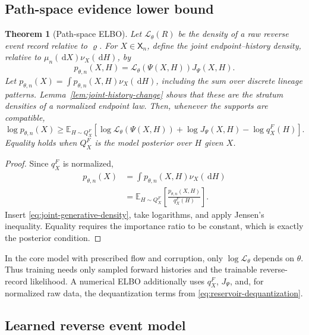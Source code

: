 \documentclass[10pt]{article}
\newtheorem{theorem}{Theorem}[section]
\theoremstyle{definition}
\theoremstyle{remark}
\newcommand{\E}{\mathbb{E}}
\newcommand{\dd}{\,\mathrm{d}}
\newcommand{\state}{\mathsf{X}}
\begin{document}
\subsection{Path-space evidence lower bound}

\begin{theorem}[Path-space ELBO]
\label{thm:path-elbo}
Let $\mathcal L_\theta(R)$ be the density of a raw reverse event record
relative to $\varrho$.  For $X\in\state_n$, define the joint
endpoint--history density, relative to
$\mu_n(\dd X)\nu_X(\dd H)$, by
\begin{equation}
  p_{\theta,n}(X,H)
  =\mathcal L_\theta(\Psi(X,H))J_\Psi(X,H).
  \label{eq:joint-generative-density}
\end{equation}
Let
$p_{\theta,n}(X)=\int p_{\theta,n}(X,H)\nu_X(\dd H)$, including the sum
over discrete lineage patterns.  Lemma~\ref{lem:joint-history-change} shows
that these are the stratum densities of a normalized endpoint law.  Then,
whenever the supports are compatible,
\begin{equation}
  \log p_{\theta,n}(X)
  \geq
  \E_{H\sim Q_X^F}
  \left[
    \log\mathcal L_\theta(\Psi(X,H))
    +\log J_\Psi(X,H)
    -\log q_X^F(H)
  \right].
  \label{eq:path-elbo}
\end{equation}
Equality holds when $Q_X^F$ is the model posterior over $H$ given $X$.
\end{theorem}

\begin{proof}
Since $q_X^F$ is normalized,
\begin{align*}
  p_{\theta,n}(X)
  &=\int p_{\theta,n}(X,H)\nu_X(\dd H)\\
  &=\E_{H\sim Q_X^F}
  \left[\frac{p_{\theta,n}(X,H)}{q_X^F(H)}\right].
\end{align*}
Insert \eqref{eq:joint-generative-density}, take logarithms, and apply
Jensen's inequality.  Equality requires the importance ratio to be constant,
which is exactly the posterior condition.
\end{proof}

In the core model with prescribed flow and corruption,
only $\log\mathcal L_\theta$ depends on $\theta$.  Thus training needs only
sampled forward histories and the trainable reverse-record likelihood.  A
numerical ELBO additionally uses $q_X^F$, $J_\Psi$, and, for normalized raw
data, the dequantization terms from \eqref{eq:reservoir-dequantization}.

\subsection{Learned reverse event model}
\end{document}
